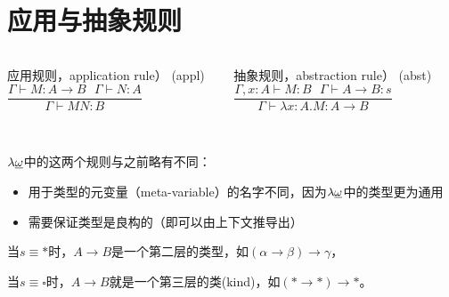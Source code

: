 \documentclass[UTF8,aspectratio=169,mathserif]{beamer}
\begin{document}
	\section{应用与抽象规则}
		\begin{frame}
			\begin{columns}
				\begin{column}{0.48\textwidth}
					\begin{exampleblock}{应用规则，application rule）}
						(appl) $\dfrac{\Gamma\vdash M:A\rightarrow B\ \ \ \Gamma\vdash N:A}{\Gamma\vdash MN:B}$
					\end{exampleblock}
				\end{column}
				\begin{column}{0.48\textwidth}
					\begin{exampleblock}{抽象规则，abstraction rule）}
						(abst) $\dfrac{\Gamma,x:A\vdash M:B\ \ \ \Gamma\vdash A\rightarrow B:s}{\Gamma\vdash\lambda x:A.M:A\rightarrow B}$
					\end{exampleblock}
				\end{column}
			\end{columns}
		
			\hspace*{\fill} \\
			
			$\lambda{\uline{\omega}}$中的这两个规则与之前略有不同：
			
			\begin{itemize}
				\item 用于类型的元变量（meta-variable）的名字不同，因为$\lambda{\uline{\omega}}$中的类型更为通用
				
				\item 需要保证类型是良构的（即可以由上下文推导出）
			\end{itemize}
			
			当$s\equiv*$时，$A\rightarrow B$是一个第二层的类型，如$(\alpha\rightarrow\beta)\rightarrow\gamma$，
			
			当$s\equiv\square$时，$A\rightarrow B$就是一个第三层的类(kind)，如$(*\rightarrow*)\rightarrow*$。
		\end{frame}
\end{document}
